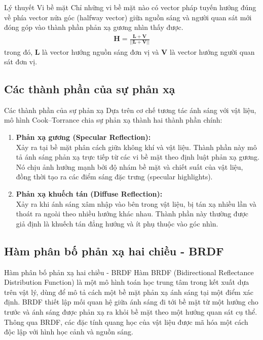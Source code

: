 \documentclass[11pt, aspectratio=169]{beamer}
\begin{document}
\begin{frame}{Lý thuyết Vi bề mặt}
	Chỉ những vi bề mặt nào có vector pháp tuyến hướng đúng về phía vector nửa góc (halfway vector) giữa nguồn sáng và người quan sát mới đóng góp vào thành phần phản xạ gương nhìn thấy được.
	\begin{gather*}
		\mathbf{H} = \frac{\mathbf{L} + \mathbf{V}}{||\mathbf{L} + \mathbf{V}||}
	\end{gather*}
	trong đó, $\mathbf{L}$ là vector hướng nguồn sáng đơn vị và $\mathbf{V}$ là vector hướng người quan sát đơn vị.
\end{frame}

\subsection{Các thành phần của sự phản xạ}
\begin{frame}{Các thành phần của sự phản xạ}
	Dựa trên cơ chế tương tác ánh sáng với vật liệu, mô hình Cook--Torrance chia sự phản xạ thành hai thành phần chính:
	
	\begin{enumerate}
		\item \textbf{Phản xạ gương (Specular Reflection):}\\
		Xảy ra tại bề mặt phân cách giữa không khí và vật liệu. Thành phần này mô tả ánh sáng phản xạ trực tiếp từ các vi bề mặt theo định luật phản xạ gương. Nó chịu ảnh hưởng mạnh bởi độ nhám bề mặt và chiết suất của vật liệu, đồng thời tạo ra các điểm sáng đặc trưng (specular highlights).
		
		\item \textbf{Phản xạ khuếch tán (Diffuse Reflection):}\\
		Xảy ra khi ánh sáng xâm nhập vào bên trong vật liệu, bị tán xạ nhiều lần và thoát ra ngoài theo nhiều hướng khác nhau. Thành phần này thường được giả định là khuếch tán đẳng hướng và ít phụ thuộc vào góc nhìn.
	\end{enumerate}
\end{frame}

\subsection{Hàm phân bố phản xạ hai chiều - BRDF}
\begin{frame}{Hàm phân bố phản xạ hai chiều - BRDF}
	Hàm BRDF (Bidirectional Reflectance Distribution Function) là một mô hình toán học trung tâm trong kết xuất dựa trên vật lý, dùng để mô tả cách một bề mặt phản xạ ánh sáng tại một điểm xác định. BRDF thiết lập mối quan hệ giữa ánh sáng đi tới bề mặt từ một hướng cho trước và ánh sáng được phản xạ ra khỏi bề mặt theo một hướng quan sát cụ thể. Thông qua BRDF, các đặc tính quang học của vật liệu được mã hóa một cách độc lập với hình học cảnh và nguồn sáng.
\end{frame}
\end{document}
